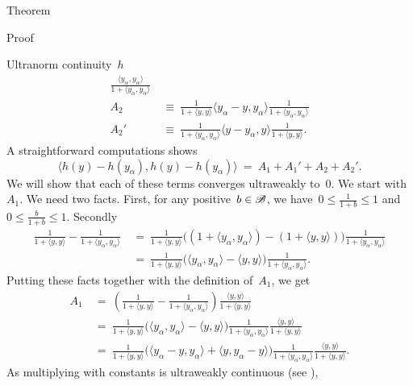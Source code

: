 \documentclass[b]{subfiles}
\begin{document}
\begin{parsec}
\begin{point}{Theorem}
\begin{point}{Proof}
\begin{point}{Ultranorm continuity~$h$}
\begin{align*}
    \frac{\langle y_\alpha,y_\alpha\rangle}{1+\langle y_\alpha,y_\alpha \rangle} \\
    A_2 & \ \equiv \ 
    \frac{1}{1+ \langle y,y \rangle}
       \langle y_\alpha- y, y_\alpha\rangle
     \frac{1}{1+ \langle y_\alpha,y_\alpha \rangle} \\
    A_2' & \ \equiv \  \frac{1}{1+ \langle y_\alpha,y_\alpha \rangle}
       \langle y- y_\alpha, y\rangle
     \frac{1}{1+ \langle y,y \rangle}.
\end{align*}
A straightforward computations shows
\begin{equation}\label{kaplansky-splitting}
    \langle h(y) - h(y_\alpha) ,
         h(y) - h(y_\alpha) \rangle  \ = \ A_1 + A_1' + A_2 + A_2'.
\end{equation}
We will show that each of these terms converges ultraweakly to~$0$.
We start with~$A_1$.
We need two facts.
First, for any positive~$b \in \mathscr{B}$, we have~$0 \leq \frac{1}{1+b} \leq 1$
and~$0 \leq \frac{b}{1+b} \leq 1$.
Secondly
\begin{align*}
    \frac{1}{1+\langle y,y\rangle }
        -
    \frac{1}{1+\langle y_\alpha,y_\alpha\rangle }
    & \ = \ 
    \frac{1}{1+\langle y,y\rangle }
    \bigl((1+\langle y_\alpha,y_\alpha \rangle) - (1+\langle y,y \rangle)\bigr) 
    \frac{1}{1+\langle y_\alpha,y_\alpha\rangle }\\
    & \ = \ 
    \frac{1}{1+\langle y,y\rangle }
   \bigl(\langle y_\alpha,y_\alpha \rangle - \langle y,y \rangle\bigr) 
    \frac{1}{1+\langle y_\alpha,y_\alpha\rangle }.
\end{align*}
Putting these facts together with the definition of~$A_1$, we get
\begin{align*}
     A_1 
    &\ = \ 
    \left(
    \frac{1}{1+\langle y,y\rangle } -
    \frac{1}{1+\langle y_\alpha,y_\alpha\rangle }\right)
            \frac{\langle y,y \rangle}{1+\langle y,y \rangle} \\
    &\ = \ 
    \frac{1}{1+\langle y,y\rangle }
   \bigl(\langle y_\alpha,y_\alpha \rangle - \langle y,y \rangle\bigr) 
    \frac{1}{1+\langle y_\alpha,y_\alpha\rangle }
            \frac{\langle y,y \rangle}{1+\langle y,y \rangle} \\
    &\ = \ 
    \frac{1}{1+\langle y,y\rangle }
   \bigl(\langle y_\alpha -y,y_\alpha \rangle + \langle y,y_\alpha - y \rangle\bigr) 
    \frac{1}{1+\langle y_\alpha,y_\alpha\rangle }
            \frac{\langle y,y \rangle}{1+\langle y,y \rangle}.
\end{align*}
As multiplying with
constants is ultraweakly continuous (see ),

\end{point}
\end{point}
\end{point}
\end{parsec}
\end{document}
